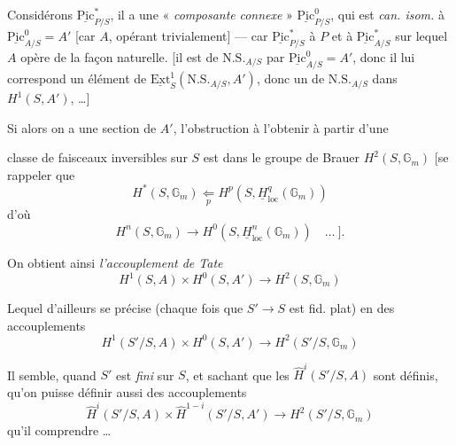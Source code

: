\documentclass[11pt,a4paper]{article}
\begin{document}

Considérons $\underline{\mathrm{Pic}}^{*}_{P/S}$, il a une « \emph{composante}
\emph{connexe}  » $\underline{\mathrm{Pic}}^{0}_{P/S}$,
\struck{\ill{}} qui est \emph{can. isom.} à $\underline{\mathrm{Pic}}^{0}_{A/S}
= A'$ [car $A$, opérant trivialement] --- car
$\underline{\mathrm{Pic}}^{*}_{P/S}$ \ill{} \emph{\ill{}} à $P$ et à
$\underline{\mathrm{Pic}}^{*}_{A/S}$ sur lequel $A$ opère de la façon
naturelle. [il est  de $\mathrm{N.S.}_{A/S}$ par
$\underline{\mathrm{Pic}}^{0}_{A/S} = A'$, donc il lui correspond un élément
de $\underline{\mathrm{Ext}}^{1}_{S}(\mathrm{N.S.}_{A/S}, A')$, donc un
\ill{} \struck{\ill{}} \add{\ill{}} de $\mathrm{N.S.}_{A/S}$ \ill{} dans
$H^1(S, A')$, \struck{\ill{}} \ill{} \ill{} \ldots]

Si alors on a une section de $A'$, l'obstruction à l'obtenir à partir d'une


classe de faisceaux inversibles  sur $S$ est dans
le groupe de Brauer $H^2(S, \mathbb{G}_m)$ [se rappeler que
\[
H^{*}(S, \mathbb{G}_m) \underset{p}{\Longleftarrow}
H^p(S, \underline{H}^q_{\mathrm{loc}}(\mathbb{G}_m))
\]
d'où
\[
H^n(S, \mathbb{G}_m) \longrightarrow
H^0(S, \underline{H}^n_{\mathrm{loc}}(\mathbb{G}_m))
\quad \ldots\ ].
\]

On obtient ainsi \emph{l'accouplement de Tate}
\[
\boxed{\;H^1(S, A) \times H^0(S, A') \longrightarrow H^2(S, \mathbb{G}_m)\;}
\]

Lequel d'ailleurs se précise (chaque fois que $S' \to S$ est fid. plat) en
des accouplements
\[
H^1(S'/S, A) \times H^0(S, A') \longrightarrow H^2(S'/S, \mathbb{G}_m)
\]

Il semble, quand $S'$ est \emph{fini} sur $S$, et sachant que les
$\hat{H}^i(S'/S, A)$ sont définis, qu'on puisse définir aussi des
accouplements
\[
\hat{H}^i(S'/S, A) \times \hat{H}^{1-i}(S'/S, A') \longrightarrow
H^2(S'/S, \mathbb{G}_m)
\]
qu'il  comprendre \ldots
\end{document}
